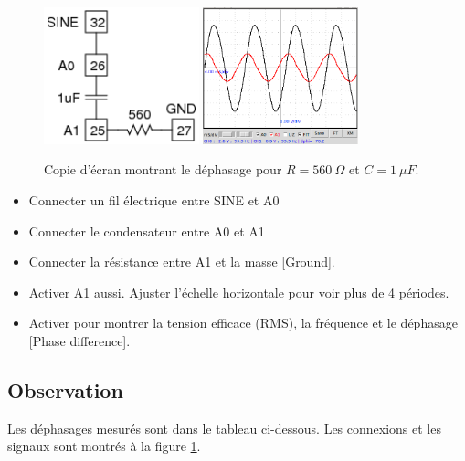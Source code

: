 \documentclass{book}
\begin{document}
\begin{figure}[h!]
\begin{center}
\caption{\label{fig:RC-phaseshift}Copie d'écran montrant le déphasage pour $R = 560\ \Omega$  et $C = 1\ \mu F$. }\vspace{0.5em}
\includegraphics[width=0.4\textwidth, height=0.3\textwidth, keepaspectratio]{Schematic-rc-steadystate.png}
\includegraphics[width=0.4\textwidth, height=0.3\textwidth, keepaspectratio]{Pic-CRphaseshift-1uf560.png}
\end{center}
\end{figure}



\begin{itemize}
  \item Connecter un fil électrique entre SINE et A0
  \item Connecter le condensateur entre A0 et A1
  \item Connecter la résistance entre A1 et la masse [Ground].
  \item Activer A1 aussi. Ajuster l'échelle horizontale pour voir plus de 4 périodes.
  \item Activer   pour montrer la tension efficace (RMS), la fréquence et le déphasage [Phase difference].
\end{itemize}

\subsection{Observation}


Les déphasages mesurés sont dans le tableau ci-dessous. Les connexions et les signaux sont montrés à la figure  \ref{fig:RC-phaseshift}.
\end{document}
